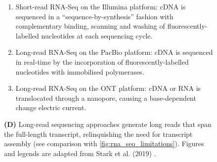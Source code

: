\begin{figure}[htp]
{		\begin{enumerate}[label=\textbf{(\Alph*)}]
			\item Short-read RNA-Seq on the Illumina platform: cDNA is sequenced in a “sequence-by-synthesis” fashion with complementary binding, scanning and washing of fluorescently-labelled nucleotides at each sequencing cycle.
			\item Long-read RNA-Seq on the PacBio platform: cDNA is sequenced in real-time by the incorporation of fluorescently-labelled nucleotides with immobilised polymerases.
			\item Long-read RNA-Seq on the ONT platform: cDNA or RNA is translocated through a nanopore, causing a base-dependent change electric current.
			\\
		\end{enumerate}
		\textbf{(D)} Long-read sequencing approaches generate long reads that span the full-length transcript, relinquishing the need for transcript assembly (see comparison with \cref{fig:rna_seq_limitations}). \newline
		Figures and legends are adapted from Stark et al. (2019) \cite{Stark2019}.
	} 
	\label{fig:longread_benefits}
\end{figure}	


